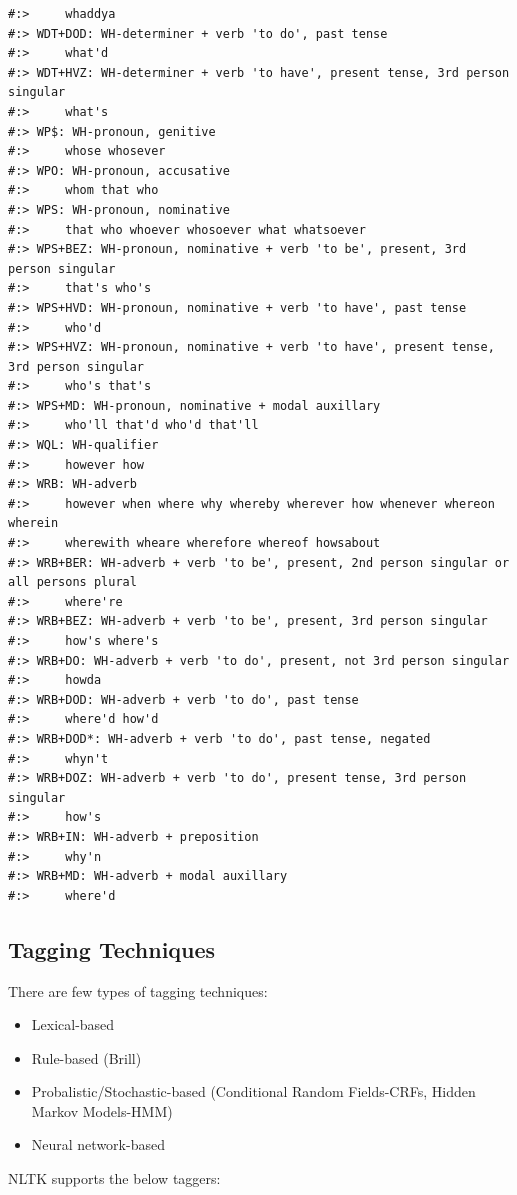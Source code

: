 \documentclass[
]{book}
\providecommand{\tightlist}{%
  \setlength{\itemsep}{0pt}\setlength{\parskip}{0pt}}
\begin{document}
\begin{verbatim}
#:>     whaddya
#:> WDT+DOD: WH-determiner + verb 'to do', past tense
#:>     what'd
#:> WDT+HVZ: WH-determiner + verb 'to have', present tense, 3rd person singular
#:>     what's
#:> WP$: WH-pronoun, genitive
#:>     whose whosever
#:> WPO: WH-pronoun, accusative
#:>     whom that who
#:> WPS: WH-pronoun, nominative
#:>     that who whoever whosoever what whatsoever
#:> WPS+BEZ: WH-pronoun, nominative + verb 'to be', present, 3rd person singular
#:>     that's who's
#:> WPS+HVD: WH-pronoun, nominative + verb 'to have', past tense
#:>     who'd
#:> WPS+HVZ: WH-pronoun, nominative + verb 'to have', present tense, 3rd person singular
#:>     who's that's
#:> WPS+MD: WH-pronoun, nominative + modal auxillary
#:>     who'll that'd who'd that'll
#:> WQL: WH-qualifier
#:>     however how
#:> WRB: WH-adverb
#:>     however when where why whereby wherever how whenever whereon wherein
#:>     wherewith wheare wherefore whereof howsabout
#:> WRB+BER: WH-adverb + verb 'to be', present, 2nd person singular or all persons plural
#:>     where're
#:> WRB+BEZ: WH-adverb + verb 'to be', present, 3rd person singular
#:>     how's where's
#:> WRB+DO: WH-adverb + verb 'to do', present, not 3rd person singular
#:>     howda
#:> WRB+DOD: WH-adverb + verb 'to do', past tense
#:>     where'd how'd
#:> WRB+DOD*: WH-adverb + verb 'to do', past tense, negated
#:>     whyn't
#:> WRB+DOZ: WH-adverb + verb 'to do', present tense, 3rd person singular
#:>     how's
#:> WRB+IN: WH-adverb + preposition
#:>     why'n
#:> WRB+MD: WH-adverb + modal auxillary
#:>     where'd
\end{verbatim}

\hypertarget{tagging-techniques}{%
\subsection{Tagging Techniques}\label{tagging-techniques}}

There are few types of tagging techniques:

\begin{itemize}
\tightlist
\item
  Lexical-based\\
\item
  Rule-based (Brill)
\item
  Probalistic/Stochastic-based (Conditional Random Fields-CRFs, Hidden Markov Models-HMM)
\item
  Neural network-based
\end{itemize}

NLTK supports the below taggers:
\end{document}

